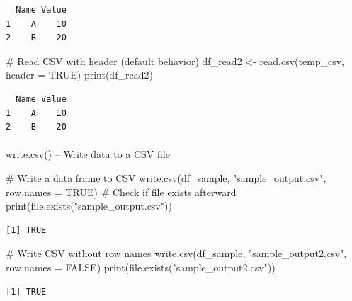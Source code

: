 \documentclass[
  letterpaper,
  DIV=11,
  numbers=noendperiod]{scrartcl}
\makeatletter
\let\oldparagraph\paragraph
\renewcommand{\paragraph}{
    \@ifstar
      \xxxParagraphStar
      \xxxParagraphNoStar
  }
\newcommand{\xxxParagraphStar}[1]{\oldparagraph*{#1}\mbox{}}
\newcommand{\xxxParagraphNoStar}[1]{\oldparagraph{#1}\mbox{}}
\newenvironment{Shaded}{\begin{snugshade}}{\end{snugshade}}
\newcommand{\AttributeTok}[1]{\textcolor[rgb]{0.40,0.45,0.13}{#1}}
\newcommand{\CommentTok}[1]{\textcolor[rgb]{0.37,0.37,0.37}{#1}}
\newcommand{\ConstantTok}[1]{\textcolor[rgb]{0.56,0.35,0.01}{#1}}
\newcommand{\FunctionTok}[1]{\textcolor[rgb]{0.28,0.35,0.67}{#1}}
\newcommand{\NormalTok}[1]{\textcolor[rgb]{0.00,0.23,0.31}{#1}}
\newcommand{\OtherTok}[1]{\textcolor[rgb]{0.00,0.23,0.31}{#1}}
\newcommand{\StringTok}[1]{\textcolor[rgb]{0.13,0.47,0.30}{#1}}
\makeatother
\begin{document}
\begin{verbatim}
  Name Value
1    A    10
2    B    20
\end{verbatim}

\begin{Shaded}
\begin{Highlighting}[]
\CommentTok{\#   Read CSV with header (default behavior)}
\NormalTok{df\_read2 }\OtherTok{\textless{}{-}} \FunctionTok{read.csv}\NormalTok{(temp\_csv, }\AttributeTok{header =} \ConstantTok{TRUE}\NormalTok{)}
\FunctionTok{print}\NormalTok{(df\_read2)}
\end{Highlighting}
\end{Shaded}

\begin{verbatim}
  Name Value
1    A    10
2    B    20
\end{verbatim}

\paragraph{write.csv() -- Write data to a CSV
file}\label{write.csv-write-data-to-a-csv-file}

\begin{Shaded}
\begin{Highlighting}[]
\CommentTok{\#   Write a data frame to CSV}
\FunctionTok{write.csv}\NormalTok{(df\_sample, }\StringTok{"sample\_output.csv"}\NormalTok{, }\AttributeTok{row.names =} \ConstantTok{TRUE}\NormalTok{)}
\CommentTok{\# Check if file exists afterward}
\FunctionTok{print}\NormalTok{(}\FunctionTok{file.exists}\NormalTok{(}\StringTok{"sample\_output.csv"}\NormalTok{))}
\end{Highlighting}
\end{Shaded}

\begin{verbatim}
[1] TRUE
\end{verbatim}

\begin{Shaded}
\begin{Highlighting}[]
\CommentTok{\#   Write CSV without row names}
\FunctionTok{write.csv}\NormalTok{(df\_sample, }\StringTok{"sample\_output2.csv"}\NormalTok{, }\AttributeTok{row.names =} \ConstantTok{FALSE}\NormalTok{)}
\FunctionTok{print}\NormalTok{(}\FunctionTok{file.exists}\NormalTok{(}\StringTok{"sample\_output2.csv"}\NormalTok{))}
\end{Highlighting}
\end{Shaded}

\begin{verbatim}
[1] TRUE
\end{verbatim}
\end{document}
